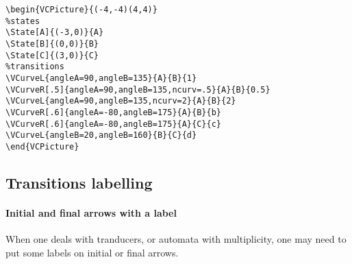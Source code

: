 \documentclass[11pt,twoside]{article}
\newlength{\parindenttemp} %
\newcommand{\noi}{\noindent}
\newlength{\jsIndent}%
\newlength{\ColSource}%
\newlength{\ColFigur}%
\begin{document}
\medskip
\noi 
\hspace*{-\jsIndent}
\begin{minipage}[c]{\ColFigur}%
\par\vspace*{0mm}%
\begin{center}
%
\end{center}
\end{minipage}%
\hspace*{1.2em}%
\begin{minipage}[c]{\ColSource}
\setlength{\parindent}{\parindenttemp}%
\par\vspace*{0mm}%
\footnotesize
\begin{verbatim}
\begin{VCPicture}{(-4,-4)(4,4)}
%states
\State[A]{(-3,0)}{A}
\State[B]{(0,0)}{B}
\State[C]{(3,0)}{C}
%transitions
\VCurveL{angleA=90,angleB=135}{A}{B}{1}
\VCurveR[.5]{angleA=90,angleB=135,ncurv=.5}{A}{B}{0.5}
\VCurveL{angleA=90,angleB=135,ncurv=2}{A}{B}{2}
\VCurveR[.6]{angleA=-80,angleB=175}{A}{B}{b}
\VCurveR[.6]{angleA=-80,angleB=175}{A}{C}{c}
\VCurveL{angleB=20,angleB=160}{B}{C}{d}
\end{VCPicture}
\end{verbatim}
\normalsize
\end{minipage}%


\subsection{Transitions labelling}

\paragraph{Initial and final arrows with a label} When one deals with
tranducers, or automata with multiplicity, one may need to put
some labels on initial or final arrows.
\end{document}
